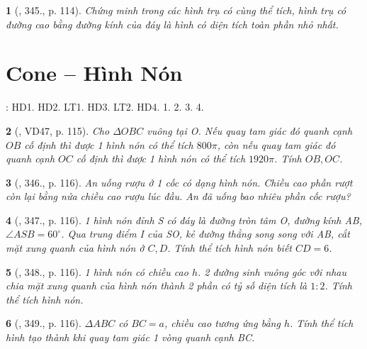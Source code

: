 \documentclass{article}
\newtheorem{baitoan}{}
\begin{document}
\begin{baitoan}[\cite{Binh_Toan_9_tap_2}, 345., p. 114]
	Chứng minh trong các hình trụ có cùng thể tích, hình trụ có đường cao bằng đường kính của đáy là hình có diện tích toàn phần nhỏ nhất.
\end{baitoan}


\section{Cone -- Hình Nón}
\cite[Chap. X, \S2, pp. 98--103]{SGK_Toan_9_Canh_Dieu_tap_1}: HD1. HD2. LT1. HD3. LT2. HD4. 1. 2. 3. 4.

\begin{baitoan}[\cite{Binh_Toan_9_tap_2}, VD47, p. 115]
	Cho $\Delta OBC$ vuông tại O. Nếu quay tam giác đó quanh cạnh $OB$ cố định thì được 1 hình nón có thể tích $800\pi$, còn nếu quay tam giác đó quanh cạnh $OC$ cố định thì được 1 hình nón có thể tích $1920\pi$. Tính $OB,OC$.
\end{baitoan}

\begin{baitoan}[\cite{Binh_Toan_9_tap_2}, 346., p. 116]
	An uống rượu ở 1 cốc có dạng hình nón. Chiều cao phần rượt còn lại bằng nửa chiều cao rượu lúc đầu. An đã uống bao nhiêu phần cốc rượu?
\end{baitoan}

\begin{baitoan}[\cite{Binh_Toan_9_tap_2}, 347., p. 116]
	1 hình nón đỉnh S có đáy là đường tròn tâm O, đường kính AB, $\angle ASB = 60^\circ$. Qua trung điểm I của SO, kẻ đường thẳng song song với AB, cắt mặt xung quanh của hình nón ở $C,D$. Tính thể tích hình nón biết $CD = 6$.
\end{baitoan}

\begin{baitoan}[\cite{Binh_Toan_9_tap_2}, 348., p. 116]
	1 hình nón có chiều cao $h$. 2 đường sinh vuông góc với nhau chia mặt xung quanh của hình nón thành 2 phần có tỷ số diện tích là $1:2$. Tính thể tích hình nón.
\end{baitoan}

\begin{baitoan}[\cite{Binh_Toan_9_tap_2}, 349., p. 116]
	$\Delta ABC$ có $BC = a$, chiều cao tương ứng bằng $h$. Tính thể tích hình tạo thành khi quay tam giác 1 vòng quanh cạnh BC.
\end{baitoan}
\end{document}
